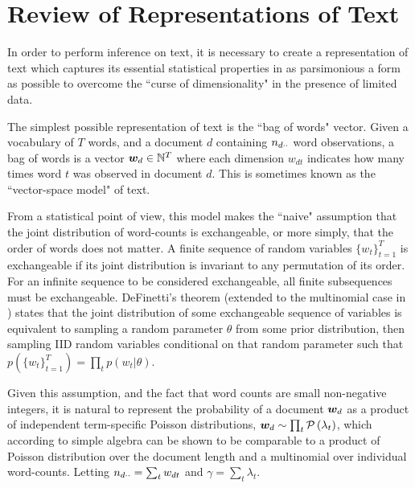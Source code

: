 

\chapter{Review of Representations of Text}

In order to perform inference on text, it is necessary to create a representation of text which captures its essential statistical properties in as parsimonious a form as possible to overcome the ``curse of dimensionality"\cite{Bishop2006} in the presence of limited data.

The simplest possible representation of text is the ``bag of words" vector. Given a vocabulary of $T$ words, and a document $d$ containing ${ n_{d\cdot\cdot} }$ word observations, a bag of words is a vector $\bm w_d \in { \mathbb{N}^{T} }$ where each dimension $w_{dt}$ indicates how many times word $t$ was observed in document $d$. This is sometimes known as the ``vector-space model"\cite{Jst2004} of text. 

From a statistical point of view, this model makes the ``naive" assumption that the joint distribution of word-counts is exchangeable, or more simply, that the order of words does not matter. A finite sequence of random variables $\{w_t\}_{t=1}^{T}$ is exchangeable if its joint distribution is invariant to any permutation of its order. For an infinite sequence to be considered exchangeable, all finite subsequences must be exchangeable. DeFinetti's theorem (extended to the multinomial case in \cite{Hewitt1955}) states that the joint distribution of some exchangeable sequence of variables is equivalent to sampling a random parameter $\theta$ from some prior distribution, then sampling IID random variables conditional on that random parameter such that $p\left(\{w_t\}_{t=1}^{T}\right) = \prod_t p(w_t | \theta)$.

Given this assumption, and the fact that word counts are small non-negative integers, it is natural to represent the probability of a document ${ \bm w_d }$ as a product of independent term-specific Poisson distributions, ${ \bm w_d } \sim \prod_t \mathcal{P} \left( {\lambda_t} \right)$, which according to simple algebra can be shown to be comparable to a product of Poisson distribution over the document length and a multinomial over individual word-counts. Letting ${ n_{d\cdot\cdot} } = \sum_t { w_{dt} }$ and $\gamma = \sum_t \lambda_t$.

